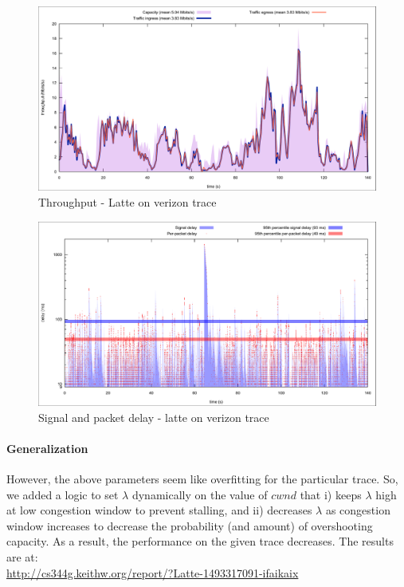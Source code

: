 \documentclass{article}
\begin{document}
\begin{figure}[h]
\includegraphics[width=1.2\columnwidth]{"tput"}
\caption{Throughput - Latte on verizon trace}
\label{tput}
\end{figure}

\begin{figure}[h]
\includegraphics[width=1.2\columnwidth]{"delay"}
\caption{Signal and packet delay - latte on verizon trace}
\label{delay}
\end{figure}


\paragraph{Generalization} However, the above parameters seem like
overfitting for the particular trace. So, we added a logic to set
$\lambda$ dynamically on the value of $cwnd$ that i) keeps
$\lambda$ high at low congestion window to prevent stalling, and ii)
decreases $\lambda$ as congestion window increases to decrease the
probability (and amount) of overshooting capacity. As a result, the
performance on the given trace decreases. The results are at:\\
\url{http://cs344g.keithw.org/report/?Latte-1493317091-ifaikaix}
\end{document}
